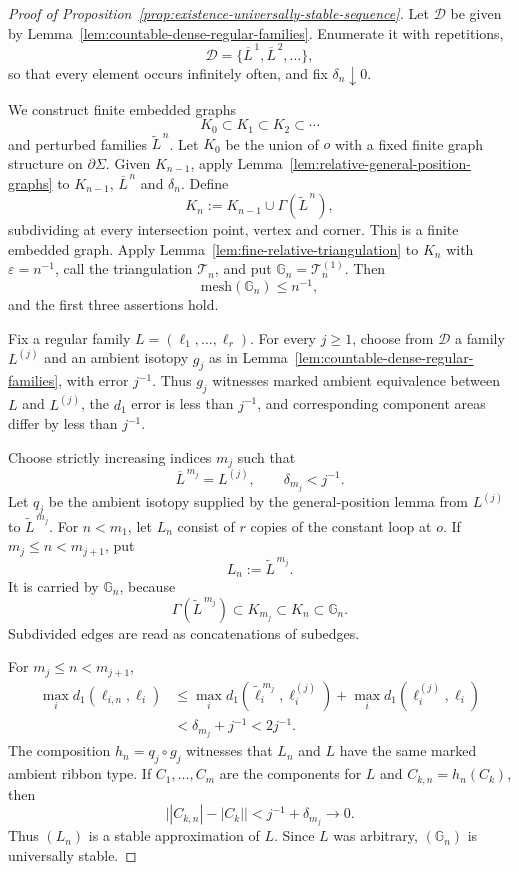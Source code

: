 \documentclass[11pt,a4paper,reqno]{article}
\theoremstyle{definition}
\theoremstyle{remark}
\newcommand\Gbb{{\mathbb{G}}}
\newcommand\mesh{{\mathrm{mesh}}}
\begin{document}
\begin{proof}[Proof of Proposition~\ref{prop:existence-universally-stable-sequence}]
Let $\mathscr D$ be given by Lemma~\ref{lem:countable-dense-regular-families}. Enumerate it with repetitions,
\[
 \mathscr D=\{\overline L^{\,1},\overline L^{\,2},\ldots\},
\]
so that every element occurs infinitely often, and fix $\delta_n\downarrow0$.

We construct finite embedded graphs
\[
 K_0\subset K_1\subset K_2\subset\cdots
\]
and perturbed families $\widetilde L^{\,n}$. Let $K_0$ be the union of $o$ with a fixed finite graph structure on $\partial\Sigma$. Given $K_{n-1}$, apply Lemma~\ref{lem:relative-general-position-graphs} to $K_{n-1}$, $\overline L^{\,n}$ and $\delta_n$. Define
\[
 K_n:=K_{n-1}\cup\Gamma(\widetilde L^{\,n}),
\]
subdividing at every intersection point, vertex and corner. This is a finite embedded graph. Apply Lemma~\ref{lem:fine-relative-triangulation} to $K_n$ with $\varepsilon=n^{-1}$, call the triangulation $\mathcal T_n$, and put $\Gbb_n=\mathcal T_n^{(1)}$. Then
\[
 \mesh(\Gbb_n)\le n^{-1},
\]
and the first three assertions hold.

Fix a regular family $L=(\ell_1,\ldots,\ell_r)$. For every $j\ge1$, choose from $\mathscr D$ a family $L^{(j)}$ and an ambient isotopy $g_j$ as in Lemma~\ref{lem:countable-dense-regular-families}, with error $j^{-1}$. Thus $g_j$ witnesses marked ambient equivalence between $L$ and $L^{(j)}$, the $d_1$ error is less than $j^{-1}$, and corresponding component areas differ by less than $j^{-1}$.

Choose strictly increasing indices $m_j$ such that
\[
 \overline L^{\,m_j}=L^{(j)},
 \qquad
 \delta_{m_j}<j^{-1}.
\]
Let $q_j$ be the ambient isotopy supplied by the general-position lemma from $L^{(j)}$ to $\widetilde L^{\,m_j}$. For $n<m_1$, let $L_n$ consist of $r$ copies of the constant loop at $o$. If $m_j\le n<m_{j+1}$, put
\[
 L_n:=\widetilde L^{\,m_j}.
\]
It is carried by $\Gbb_n$, because
\[
 \Gamma(\widetilde L^{\,m_j})
 \subset K_{m_j}\subset K_n\subset\Gbb_n.
\]
Subdivided edges are read as concatenations of subedges.

For $m_j\le n<m_{j+1}$,
\[
\begin{aligned}
 \max_i d_1(\ell_{i,n},\ell_i)
 &\le
 \max_i d_1(\widetilde\ell_i^{\,m_j},\ell_i^{(j)})
 +
 \max_i d_1(\ell_i^{(j)},\ell_i) \\
 &<\delta_{m_j}+j^{-1}<2j^{-1}.
\end{aligned}
\]
The composition $h_n=q_j\circ g_j$ witnesses that $L_n$ and $L$ have the same marked ambient ribbon type. If $C_1,\ldots,C_m$ are the components for $L$ and $C_{k,n}=h_n(C_k)$, then
\[
 \bigl||C_{k,n}|-|C_k|\bigr|
 <j^{-1}+\delta_{m_j}\longrightarrow0.
\]
Thus $(L_n)$ is a stable approximation of $L$. Since $L$ was arbitrary, $(\Gbb_n)$ is universally stable.
\end{proof}




\end{document}
